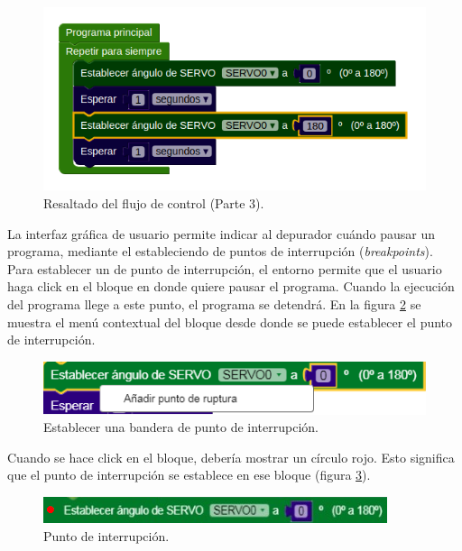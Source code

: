 \begin{figure}[!htbp]
	\begin{center}  %
		\includegraphics[scale=.60]{./Figures/debugPaso3.PNG}
		\par\caption{Resaltado del flujo de control (Parte 3).}\label{fig:debugPaso3}
	\end{center}
\end{figure}

La interfaz gráfica de usuario permite indicar al depurador cuándo pausar un programa, mediante el estableciendo de puntos de interrupción (\emph{breakpoints}).
Para establecer un de punto de interrupción, el entorno permite que el usuario haga click en el bloque en donde quiere pausar el programa. Cuando la ejecución del programa llege a este punto, el programa se detendrá. En la figura \ref{fig:add-breakpoint} se muestra el menú contextual del bloque desde donde se puede establecer el punto de interrupción.

\begin{figure}[!htbp]
	\centering
	\includegraphics[scale=.65]{./Figures/add-breakpoint.PNG}
	\caption{Establecer una bandera de punto de interrupción.}
	\label{fig:add-breakpoint}
\end{figure}

Cuando se hace click en el bloque, debería mostrar un círculo rojo. Esto significa que el punto de interrupción se establece en ese bloque (figura \ref{fig:breakpoint}).

\begin{figure}[!htbp]
	\centering
	\includegraphics[scale=.65]{./Figures/breakpoint.PNG}
	\caption{Punto de interrupción.}
	\label{fig:breakpoint}
\end{figure}

